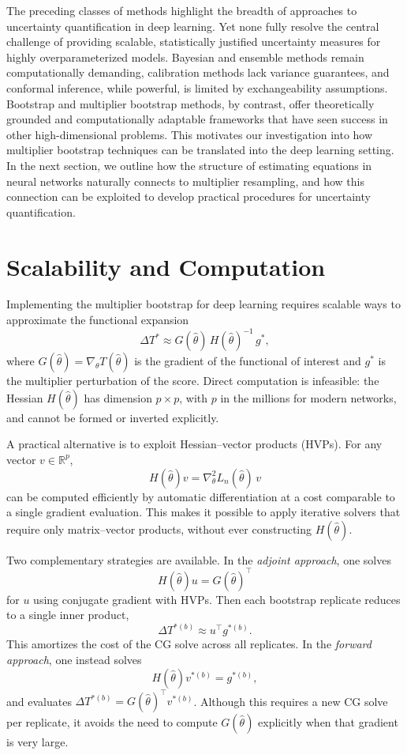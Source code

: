 \documentclass[12pt, titlepage, reqno]{article}
\begin{document}
The preceding classes of methods highlight the breadth of approaches
to uncertainty quantification in deep learning. Yet none fully resolve
the central challenge of providing scalable, statistically justified
uncertainty measures for highly overparameterized models. Bayesian and
ensemble methods remain computationally demanding, calibration methods
lack variance guarantees, and conformal inference, while powerful, is
limited by exchangeability assumptions. Bootstrap and multiplier
bootstrap methods, by contrast, offer theoretically grounded and
computationally adaptable frameworks that have seen success in other
high-dimensional problems. This motivates our investigation into how
multiplier bootstrap techniques can be translated into the deep
learning setting. In the next section, we outline how the structure of
estimating equations in neural networks naturally connects to
multiplier resampling, and how this connection can be exploited to
develop practical procedures for uncertainty quantification.

\section{Scalability and Computation}

Implementing the multiplier bootstrap for deep learning requires
scalable ways to approximate the functional expansion
\[
  \Delta T^{*} \approx
  G(\hat\theta)\,H(\hat\theta)^{-1}\,g^{*},
\]
where $G(\hat\theta)=\nabla_\theta T(\hat\theta)$ is the gradient of
the functional of interest and $g^{*}$ is the multiplier perturbation
of the score. Direct computation is infeasible: the Hessian
$H(\hat\theta)$ has dimension $p \times p$, with $p$ in the millions
for modern networks, and cannot be formed or inverted explicitly.


A practical alternative is to exploit Hessian--vector products (HVPs).
For any vector $v\in\mathbb{R}^p$,
\[
  H(\hat\theta) v =
  \nabla^2_\theta L_n(\hat\theta)\,v
\]
can be computed efficiently by automatic differentiation at a cost
comparable to a single gradient evaluation. This makes it possible to
apply iterative solvers that require only matrix–vector products,
without ever constructing $H(\hat\theta)$.


Two complementary strategies are available. In the \emph{adjoint
approach}, one solves
\[
  H(\hat\theta) u = G(\hat\theta)^\top
\]
for $u$ using conjugate gradient with HVPs. Then each bootstrap
replicate reduces to a single inner product,
\[
  \Delta T^{*(b)} \approx u^\top g^{*(b)}.
\]
This amortizes the cost of the CG solve across all replicates. In the
\emph{forward approach}, one instead solves
\[
  H(\hat\theta) v^{*(b)} = g^{*(b)},
\]
and evaluates
$\Delta T^{*(b)} = G(\hat\theta)^\top v^{*(b)}$. Although this requires
a new CG solve per replicate, it avoids the need to compute
$G(\hat\theta)$ explicitly when that gradient is very large.
\end{document}

